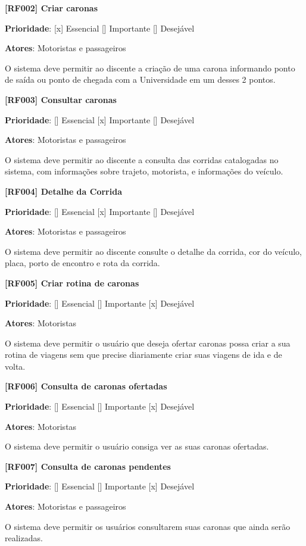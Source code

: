 \textbf{[RF002] Criar caronas}

\textbf{Prioridade}:      [x] Essencial        [] Importante     [] Desejável 

\textbf{Atores}: Motoristas e passageiros

O sistema deve permitir ao discente a criação de uma carona informando ponto de saída ou ponto de chegada com a Universidade em um desses 2 pontos.

\textbf{[RF003] Consultar caronas}

\textbf{Prioridade}:      [] Essencial        [x] Importante     [] Desejável 

\textbf{Atores}: Motoristas e passageiros

O sistema deve permitir ao discente a consulta das corridas catalogadas no sistema, com informações sobre trajeto, motorista, e informações do veículo.

\textbf{[RF004] Detalhe da Corrida}

\textbf{Prioridade}:      [] Essencial        [x] Importante     [] Desejável 

\textbf{Atores}: Motoristas e passageiros

O sistema deve permitir ao discente consulte o detalhe da corrida, cor do veículo, placa, porto de encontro e rota da corrida.

\textbf{[RF005] Criar rotina de caronas}

\textbf{Prioridade}:      [] Essencial        [] Importante     [x] Desejável 

\textbf{Atores}: Motoristas

O sistema deve permitir o usuário que deseja ofertar caronas possa criar a sua rotina de viagens sem que precise diariamente criar suas viagens de ida e de volta.


\textbf{[RF006] Consulta de caronas ofertadas}

\textbf{Prioridade}:      [] Essencial        [] Importante     [x] Desejável 

\textbf{Atores}: Motoristas

O sistema deve permitir o usuário consiga ver as suas caronas ofertadas.


\textbf{[RF007] Consulta de caronas pendentes}

\textbf{Prioridade}:      [] Essencial        [] Importante     [x] Desejável 

\textbf{Atores}: Motoristas e passageiros

O sistema deve permitir os usuários consultarem suas caronas que ainda serão realizadas.

